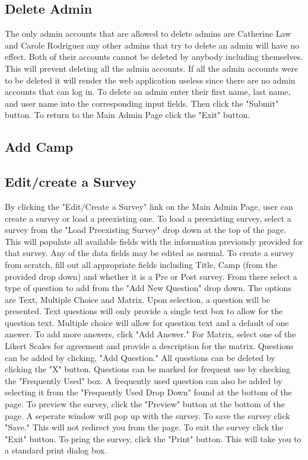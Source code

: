 \documentclass[letterpaper,10pt,serif, draftclsnofoot,onecolumn, compsoc, titlepage]{IEEEtran}
\begin{document}
\subsection{Delete Admin}
The only admin accounts that are allowed to delete admins are Catherine Law and Carole Rodriguez any other admins that try to delete an admin will have no effect. Both of their accounts cannot be deleted by anybody including themselves. This will prevent deleting all the admin accounts. If all the admin accounts were to be deleted it will render the web application useless since there are no admin accounts that can log in. To delete an admin enter their first name, last name, and user name into the corresponding input fields. Then click the "Submit" button. To return to the Main Admin Page click the "Exit" button. 
\subsection{Add Camp}
\subsection{Edit/create a Survey}
By clicking the "Edit/Create a Survey" link on the Main Admin Page, user can create a survey or 
load a preexisting one. To load a preexisting survey, select a survey from the "Load Preexisting Survey"
 drop down at the top of the page. This will populate all available fields with the information 
 previously provided for that survey. Any of the data fields may be edited as normal. 
 To create a survey from scratch, fill out all appropriate fields including Title, Camp (from the provided 
 drop down) and whether it is a Pre or Post survey. From there select a type of question to add from the 
 "Add New Question" drop down. The options are Text, Multiple Choice and Matrix. Upon selection, a question will 
 be presented. Text questions will only provide a single text box to allow for the question text. 
 Multiple choice will allow for question text and a default of one answer. To add more answers, click "Add Answer."
 For Matrix, select one of the Likert Scales for agreement and provide a description for the matrix. Questions can 
 be added by clicking, "Add Question." All questions can be deleted by clicking the "X" button. Questions can be marked 
 for frequent use by checking the "Frequently Used" box. 
 A frequently used question can also be added by selecting it from the "Frequently Used Drop Down" 
 found at the bottom of the page. To preview the survey, click the "Preview" button at the bottom of the page. 
 A seperate window will pop up with the survey. To save the survey click "Save." This will not redirect you from 
 the page. To exit the survey click the "Exit" button. To pring the survey, click the "Print" button. This will take 
 you to a standard print dialog box. 
\end{document}
